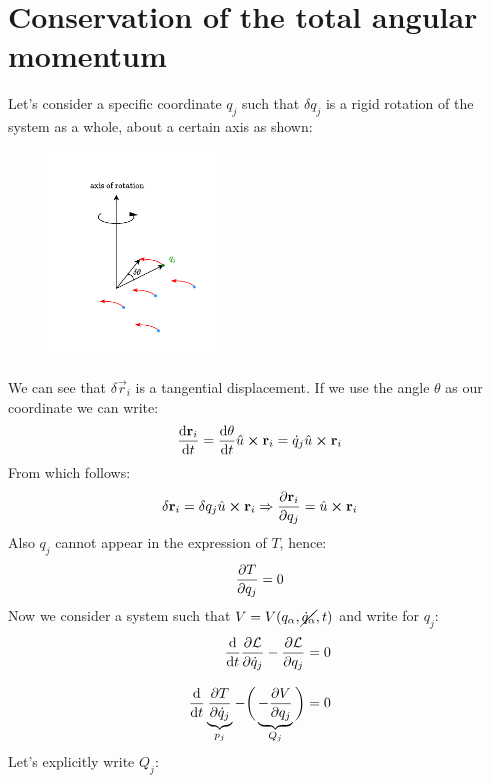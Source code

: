 \section{Conservation of the total angular momentum}
Let's consider a specific coordinate $q_j$ such that $\delta q_j$ is a rigid rotation of the system as a whole, about a certain axis as shown:
\begin{figure}[H]
    \centering
    \includegraphics[width=0.4\textwidth]{res/svg/collective_rotation.drawio}
\end{figure}
We can see that $\delta \vec{r}_i$ is a tangential displacement. If we use the angle $\theta$ as our coordinate we can write:
\begin{equation}
    \dv{\vec{r}_i}{t} = \dv{\theta}{t} \hat{u} \cross \vec{r}_i = \dot{q}_j \hat{u} \cross \vec{r}_i
\end{equation}
From which follows:
\begin{equation}
    \delta \vec{r}_i = \delta q_j \hat{u} \cross \vec{r}_i \Rightarrow \pdv{\vec{r}_i}{q_j} = \hat{u} \cross \vec{r}_i
\end{equation}
Also $q_j$ cannot appear in the expression of $T$, hence:
\begin{equation}
    \pdv{T}{q_j} = 0
\end{equation}
Now we consider a system such that $V = V(q_{\alpha},\cancel{\dot{q}_{\alpha}},t)$ and write \eleref\;for $q_j$:
\begin{equation} \label{e:ele_for_angular_momentum}
    \begin{split}
        \dv{}{t}\pdv{\lagr}{\dot{q}_j} - \pdv{\lagr}{q_j} = 0\\[8pt]
        \dv{}{t}\underbrace{\pdv{T}{\dot{q}_j}}_{p_j} - \bbrackets{\underbrace{- \pdv{V}{q_j}}_{Q_j}} = 0
    \end{split}
\end{equation}
Let's explicitly write $Q_j$:
